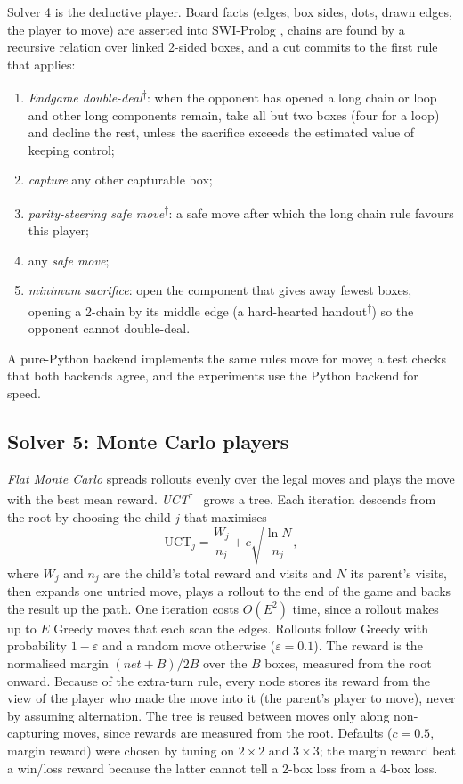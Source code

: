 \documentclass[11pt,a4paper]{article}
\newcommand{\bd}[2]{$#1{\times}#2$}            %
\newcommand{\outside}{\textsuperscript{$\dagger$}} %
\begin{document}
Solver 4 is the deductive player. Board facts (edges, box sides, dots, drawn edges, the
player to move) are asserted into SWI-Prolog \cite{wielemaker2012swipl,clocksin2003prolog},
chains are found by a recursive relation over linked 2-sided boxes, and a cut commits to
the first rule that applies:
\begin{enumerate}
\item \emph{Endgame double-deal}\outside: when the opponent has opened a long chain or
  loop and other long components remain, take all but two boxes (four for a loop) and
  decline the rest, unless the sacrifice exceeds the estimated value of keeping control;
\item \emph{capture} any other capturable box;
\item \emph{parity-steering safe move}\outside: a safe move after which the long chain
  rule favours this player;
\item any \emph{safe move};
\item \emph{minimum sacrifice}: open the component that gives away fewest boxes, opening
  a 2-chain by its middle edge (a hard-hearted handout\outside) so the opponent cannot
  double-deal.
\end{enumerate}
A pure-Python backend implements the same rules move for move; a test checks that both
backends agree, and the experiments use the Python backend for speed.

\subsection{Solver 5: Monte Carlo players}

\emph{Flat Monte Carlo} spreads rollouts evenly over the legal moves and plays the move
with the best mean reward. \emph{UCT}\outside\ \cite{kocsis2006bandit} grows a tree. Each
iteration descends from the root by choosing the child $j$ that maximises
\begin{equation}
  \mathrm{UCT}_j = \frac{W_j}{n_j} + c\sqrt{\frac{\ln N}{n_j}},
  \label{eq:uct}
\end{equation}
where $W_j$ and $n_j$ are the child's total reward and visits and $N$ its parent's visits,
then expands one untried move, plays a rollout to the end of the game and backs the result
up the path. One iteration costs $O(E^2)$ time, since a rollout makes up to $E$ Greedy
moves that each scan the edges. Rollouts follow Greedy with
probability $1-\varepsilon$ and a random move otherwise ($\varepsilon=0.1$). The reward is
the normalised margin $(\mathit{net}+B)/2B$ over the $B$ boxes, measured from the root
onward. Because of the extra-turn rule, every node stores its reward from the view of
the player who made the move into it (the parent's player to move), never by assuming
alternation. The tree is reused between moves only along non-capturing moves, since
rewards are measured from the root. Defaults ($c=0.5$, margin reward) were chosen by
tuning on \bd{2}{2} and \bd{3}{3}; the margin reward beat a win/loss reward because the
latter cannot tell a 2-box loss from a 4-box loss.
\end{document}
